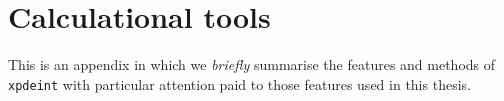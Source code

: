 \chapter{Calculational tools}
\label{ToolsAppendix}
\graphicspath{{Figures/ToolsAppendix/}{Figures/Common/}}

This is an appendix in which we \emph{briefly} summarise the features and methods of \texttt{xpdeint} with particular attention paid to those features used in this thesis.